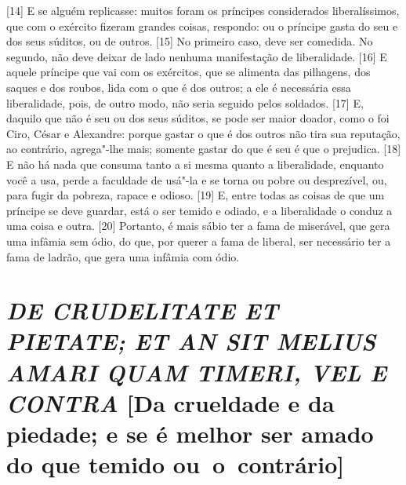 {[}14{]} E se alguém replicasse: muitos foram os príncipes considerados
liberalíssimos, que com o exército fizeram grandes coisas, respondo: ou
o príncipe gasta do seu e dos seus súditos, ou de outros. {[}15{]} No
primeiro caso, deve ser comedida. No segundo, não deve deixar de lado
nenhuma manifestação de liberalidade. {[}16{]} E aquele príncipe que vai
com os exércitos, que se alimenta das pilhagens, dos saques e dos
roubos, lida com o que é dos outros; a ele é necessária essa
liberalidade, pois, de outro modo, não seria seguido pelos soldados.
{[}17{]} E, daquilo que não é seu ou dos seus súditos, se pode ser maior
doador, como o foi Ciro, César e Alexandre: porque gastar o que é dos
outros não tira sua reputação, ao contrário, agrega"-lhe mais; somente
gastar do que é seu é que o prejudica. {[}18{]} E não há nada que
consuma tanto a si mesma quanto a liberalidade, enquanto você a usa,
perde a faculdade de usá"-la e se torna ou pobre ou desprezível, ou, para
fugir da pobreza, rapace e odioso. {[}19{]} E, entre todas as coisas de
que um príncipe se deve guardar, está o ser temido e odiado, e a
liberalidade o conduz a uma coisa e outra. {[}20{]} Portanto, é mais
sábio ter a fama de miserável, que gera uma infâmia sem ódio, do que,
por querer a fama de liberal, ser necessário ter a fama de ladrão, que
gera uma infâmia com ódio.

\quebra\section{\emph{DE CRUDELITATE ET PIETATE; ET AN SIT MELIUS AMARI QUAM TIMERI, VEL
E CONTRA}\break
{[}Da crueldade e da piedade; e se é melhor ser amado do que temido ou~o~contrário{]}}

